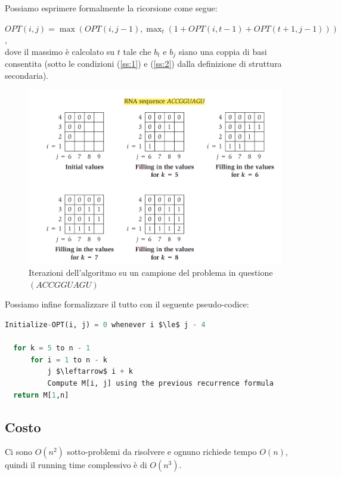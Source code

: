 Possiamo esprimere formalmente la ricorsione come segue:
\\
\begin{myblockquote}
  $OPT(i, j) = \max(OPT(i, j-1), \max_t(1+OPT(i, t-1)+OPT(t+1, j-1)))$,\\
  dove il massimo è calcolato su $t$ tale che $b_t$ e
  $b_j$ siano una coppia di basi consentita (sotto le condizioni (\ref{ss:1}) e
  (\ref{ss:2}) dalla definizione di struttura secondaria).
\end{myblockquote}



\begin{figure}[H]
  \includegraphics[width=12cm, keepaspectratio]{capitoli/programmazione_dinamica/imgs/rna4.png}
  \centering
  \caption{Iterazioni dell'algoritmo su un campione del problema in
    questione $(ACCGGUAGU)$}
\end{figure}


Possiamo infine formalizzare il tutto con il seguente pseudo-codice:

\begin{lstlisting}[language=Python, mathescape=true]
  Initialize-OPT(i, j) = 0 whenever i $\le$ j - 4

  for k = 5 to n - 1 
	  for i = 1 to n - k
		  j $\leftarrow$ i + k
		  Compute M[i, j] using the previous recurrence formula
  return M[1,n]
\end{lstlisting}

\subsection{Costo}

Ci sono $O(n^2)$ sotto-problemi da risolvere e ognuno richiede tempo
$O(n)$, quindi il running time complessivo è di $O(n^3)$.\\

